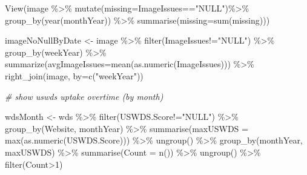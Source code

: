 \documentclass[
]{article}
\newenvironment{Shaded}{\begin{snugshade}}{\end{snugshade}}
\newcommand{\AttributeTok}[1]{\textcolor[rgb]{0.77,0.63,0.00}{#1}}
\newcommand{\CommentTok}[1]{\textcolor[rgb]{0.56,0.35,0.01}{\textit{#1}}}
\newcommand{\DecValTok}[1]{\textcolor[rgb]{0.00,0.00,0.81}{#1}}
\newcommand{\FunctionTok}[1]{\textcolor[rgb]{0.00,0.00,0.00}{#1}}
\newcommand{\NormalTok}[1]{#1}
\newcommand{\OtherTok}[1]{\textcolor[rgb]{0.56,0.35,0.01}{#1}}
\newcommand{\SpecialCharTok}[1]{\textcolor[rgb]{0.00,0.00,0.00}{#1}}
\newcommand{\StringTok}[1]{\textcolor[rgb]{0.31,0.60,0.02}{#1}}
\begin{document}
\begin{Shaded}
\begin{Highlighting}[]
\FunctionTok{View}\NormalTok{(image }\SpecialCharTok{\%\textgreater{}\%}
  \FunctionTok{mutate}\NormalTok{(}\AttributeTok{missing=}\NormalTok{ImageIssues}\SpecialCharTok{==}\StringTok{"NULL"}\NormalTok{)}\SpecialCharTok{\%\textgreater{}\%}
  \FunctionTok{group\_by}\NormalTok{(}\FunctionTok{year}\NormalTok{(monthYear)) }\SpecialCharTok{\%\textgreater{}\%}
  \FunctionTok{summarise}\NormalTok{(}\AttributeTok{missing=}\FunctionTok{sum}\NormalTok{(missing)))}

\NormalTok{imageNoNullByDate }\OtherTok{\textless{}{-}}\NormalTok{ image }\SpecialCharTok{\%\textgreater{}\%}
  \FunctionTok{filter}\NormalTok{(ImageIssues}\SpecialCharTok{!=}\StringTok{"NULL"}\NormalTok{) }\SpecialCharTok{\%\textgreater{}\%}
  \FunctionTok{group\_by}\NormalTok{(weekYear) }\SpecialCharTok{\%\textgreater{}\%}
  \FunctionTok{summarize}\NormalTok{(}\AttributeTok{avgImageIssues=}\FunctionTok{mean}\NormalTok{(}\FunctionTok{as.numeric}\NormalTok{(ImageIssues))) }\SpecialCharTok{\%\textgreater{}\%}
  \FunctionTok{right\_join}\NormalTok{(image, }\AttributeTok{by=}\FunctionTok{c}\NormalTok{(}\StringTok{"weekYear"}\NormalTok{))}
\end{Highlighting}
\end{Shaded}

\begin{Shaded}
\begin{Highlighting}[]
\CommentTok{\# show uswds uptake overtime (by month)}

\NormalTok{wdsMonth }\OtherTok{\textless{}{-}}\NormalTok{ wds }\SpecialCharTok{\%\textgreater{}\%}
  \FunctionTok{filter}\NormalTok{(USWDS.Score}\SpecialCharTok{!=}\StringTok{"NULL"}\NormalTok{) }\SpecialCharTok{\%\textgreater{}\%}
  \FunctionTok{group\_by}\NormalTok{(Website, monthYear) }\SpecialCharTok{\%\textgreater{}\%}
  \FunctionTok{summarise}\NormalTok{(}\AttributeTok{maxUSWDS =} \FunctionTok{max}\NormalTok{(}\FunctionTok{as.numeric}\NormalTok{(USWDS.Score))) }\SpecialCharTok{\%\textgreater{}\%}
  \FunctionTok{ungroup}\NormalTok{() }\SpecialCharTok{\%\textgreater{}\%}
  \FunctionTok{group\_by}\NormalTok{(monthYear, maxUSWDS) }\SpecialCharTok{\%\textgreater{}\%}
  \FunctionTok{summarise}\NormalTok{(}\AttributeTok{Count =} \FunctionTok{n}\NormalTok{()) }\SpecialCharTok{\%\textgreater{}\%}
  \FunctionTok{ungroup}\NormalTok{() }\SpecialCharTok{\%\textgreater{}\%}
  \FunctionTok{filter}\NormalTok{(Count}\SpecialCharTok{\textgreater{}}\DecValTok{1}\NormalTok{)}
\end{Highlighting}
\end{Shaded}
\end{document}
